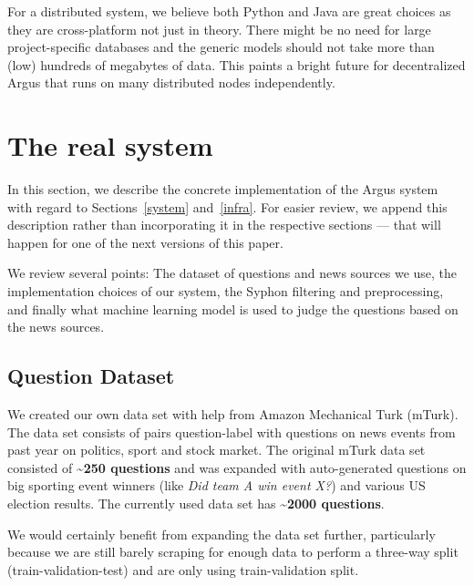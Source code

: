 \documentclass[11pt,a4paper]{article}
\begin{document}
For a distributed system, we believe both Python and Java are great
choices as they are cross-platform not just in theory.  There might
be no need for large project-specific databases and the generic models
should not take more than (low) hundreds of megabytes of data.  This
paints a bright future for decentralized Argus that runs on many
distributed nodes independently.

\newcommand{\gray}[1]{\textcolor{gray}{#1}}
\newcommand{\olive}[1]{\textcolor{olive}{\textbf{#1}}}
\newcommand{\brown}[1]{\textcolor{brown}{\textit{#1}}}
\newcommand{\other}[1]{\textcolor{orange}{\textit{#1}}}



\section{The real system}
\label{real}

In this section, we describe the concrete implementation of the Argus system
with regard to Sections~\ref{system} and~\ref{infra}.  For easier review,
we append this description rather than incorporating it in the respective
sections --- that will happen for one of the next versions of this paper.

We review several points: The dataset of questions and news sources we use,
the implementation choices of our system, the Syphon filtering and
preprocessing, and finally what machine learning model is used to judge
the questions based on the news sources.

\subsection{Question Dataset}

We created our own data set with help from Amazon Mechanical Turk (mTurk). The data set consists of pairs question-label with questions on news events from past year on politics, sport and stock market. The original mTurk data set consisted of \textbf{\textasciitilde 250 questions} and was expanded with auto-generated questions on big sporting event winners (like \textit{Did team A win event X?}) and various US election results. The currently used data set has \textbf{\textasciitilde 2000 questions}.

We would certainly benefit from expanding the data set further, particularly because we are still barely scraping for enough data to perform a three-way split (train-validation-test) and are only using train-validation split.
\end{document}
